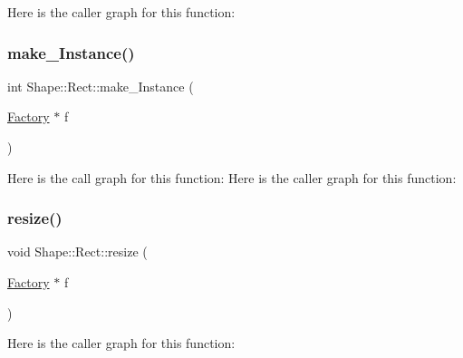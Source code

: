Here is the caller graph for this function\+:
\mbox{\label{namespace_shape_1_1_rect_aea84bb9ed2eff065d6e0e7f902ef8ff4}} 
\subsubsection{\texorpdfstring{make\+\_\+\+Instance()}{make\_Instance()}}
{\footnotesize\ttfamily int Shape\+::\+Rect\+::make\+\_\+\+Instance (\begin{DoxyParamCaption}\item[{\mbox{\hyperlink{struct_shape_1_1_rect_1_1_factory}{Factory}} $\ast$}]{f }\end{DoxyParamCaption})}

Here is the call graph for this function\+:
Here is the caller graph for this function\+:
\mbox{\label{namespace_shape_1_1_rect_a884c1d22d2af0772a9ab2121819e2631}} 
\subsubsection{\texorpdfstring{resize()}{resize()}}
{\footnotesize\ttfamily void Shape\+::\+Rect\+::resize (\begin{DoxyParamCaption}\item[{\mbox{\hyperlink{struct_shape_1_1_rect_1_1_factory}{Factory}} $\ast$}]{f }\end{DoxyParamCaption})}

Here is the caller graph for this function\+:
